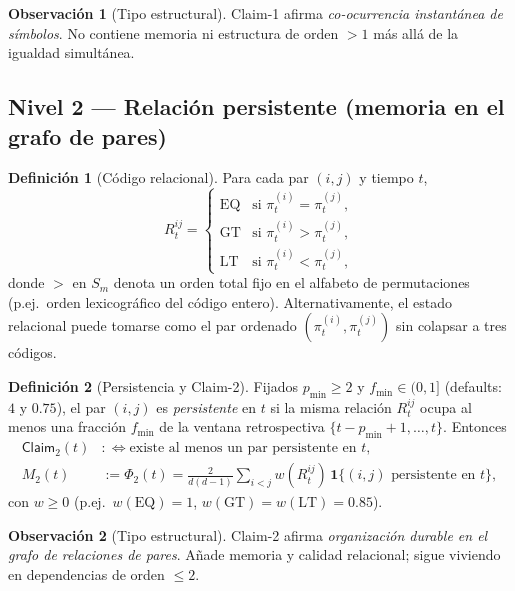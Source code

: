 \documentclass[11pt,a4paper]{article}
\theoremstyle{definition}
\newtheorem{definition}{Definici\'on}[section]
\newtheorem{remark}{Observaci\'on}[section]
\theoremstyle{plain}
\theoremstyle{remark}
\newcommand{\claim}{\mathsf{Claim}}
\begin{document}
\begin{remark}[Tipo estructural]
Claim-1 afirma \emph{co-ocurrencia instant\'anea de s\'imbolos}. No
contiene memoria ni estructura de orden $>1$ m\'as all\'a de la igualdad
simult\'anea.
\end{remark}

\subsection{Nivel 2 --- Relaci\'on persistente (memoria en el grafo de pares)}

\begin{definition}[C\'odigo relacional]
\label{def:Rcode}
Para cada par $(i,j)$ y tiempo $t$,
\begin{equation}
R_t^{ij}
=
\begin{cases}
\mathrm{EQ} & \text{si }\pi_t^{(i)}=\pi_t^{(j)},\\
\mathrm{GT} & \text{si }\pi_t^{(i)}>\pi_t^{(j)},\\
\mathrm{LT} & \text{si }\pi_t^{(i)}<\pi_t^{(j)},
\end{cases}
\end{equation}
donde $>$ en $S_m$ denota un orden total fijo en el alfabeto de
permutaciones (p.ej.\ orden lexicogr\'afico del c\'odigo entero).
Alternativamente, el estado relacional puede tomarse como el par
ordenado $(\pi_t^{(i)},\pi_t^{(j)})$ sin colapsar a tres c\'odigos.
\end{definition}

\begin{definition}[Persistencia y Claim-2]
\label{def:L2}
Fijados $p_{\min}\ge 2$ y $f_{\min}\in(0,1]$ (defaults: $4$ y $0.75$),
el par $(i,j)$ es \emph{persistente} en $t$ si la misma relaci\'on
$R_t^{ij}$ ocupa al menos una fracci\'on $f_{\min}$ de la ventana
retrospectiva $\{t-p_{\min}+1,\ldots,t\}$. Entonces
\begin{align}
\claim_2(t)
&:\iff \text{existe al menos un par persistente en $t$},\\
M_2(t)
&:=\Phi_2(t)
=\frac{2}{d(d-1)}\sum_{i<j}
w(R_t^{ij})\,\mathbf{1}\{\text{$(i,j)$ persistente en $t$}\},
\end{align}
con $w\ge 0$ (p.ej.\ $w(\mathrm{EQ})=1$, $w(\mathrm{GT})=w(\mathrm{LT})=0.85$).
\end{definition}

\begin{remark}[Tipo estructural]
Claim-2 afirma \emph{organizaci\'on durable en el grafo de relaciones de
pares}. A\~nade memoria y calidad relacional; sigue viviendo en
dependencias de orden $\le 2$.
\end{remark}
\end{document}
